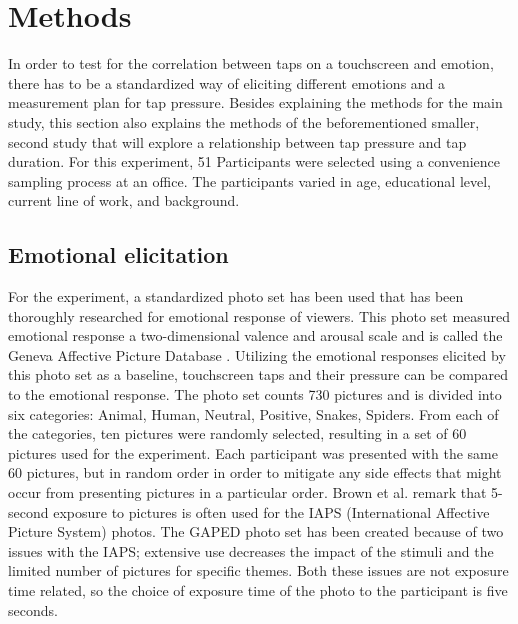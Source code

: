 \documentclass{sigchi}
\begin{document}


\section{Methods} %
\label{sec:methods}
In order to test for the correlation between taps on a touchscreen and emotion, there has to be a standardized way of eliciting different emotions and a measurement plan for tap pressure. Besides explaining the methods for the main study, this section also explains the methods of the beforementioned smaller, second study that will explore a relationship between tap pressure and tap duration. For this experiment, 51 Participants were selected using a convenience sampling process at an office. The participants varied in age, educational level, current line of work, and background. 

\subsection{Emotional elicitation} %
\label{sub:emotional_elicitation}
For the experiment, a standardized photo set has been used that has been thoroughly researched for emotional response of viewers. This photo set measured emotional response a two-dimensional valence and arousal scale and is called the Geneva Affective Picture Database \cite{Dan-glauser2011}. Utilizing the emotional responses elicited by this photo set as a baseline, touchscreen taps and their pressure can be compared to the emotional response. The photo set counts 730 pictures and is divided into six categories: Animal, Human, Neutral, Positive, Snakes, Spiders. From each of the categories, ten pictures were randomly selected, resulting in a set of 60 pictures used for the experiment. Each participant was presented with the same 60 pictures, but in random order in order to mitigate any side effects that might occur from presenting pictures in a particular order. Brown et al. \cite{Neuroscience2012} remark that 5-second exposure to pictures is often used for the IAPS (International Affective Picture System) \cite{Lang1997} photos. The GAPED photo set has been created because of two issues with the IAPS; extensive use decreases the impact of the stimuli and the limited number of pictures for specific themes. Both these issues are not exposure time related, so the choice of exposure time of the photo to the participant is five seconds.
\end{document}
